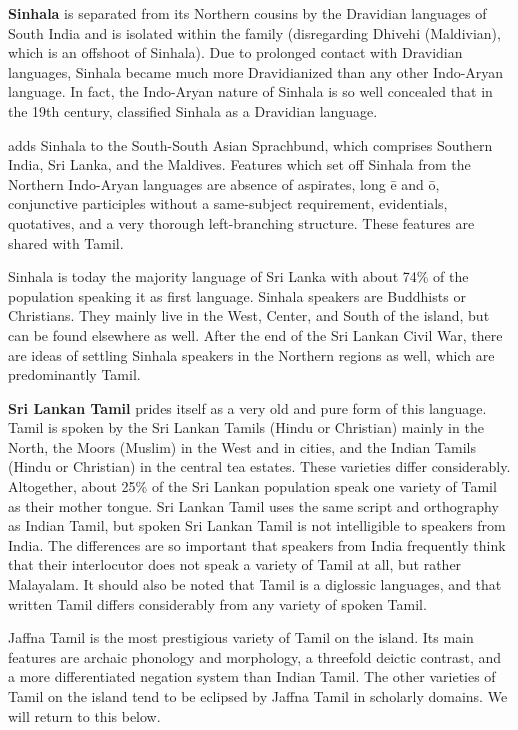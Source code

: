\documentclass[handout,utf8]{article}
\begin{document}
\textbf{Sinhala} is separated from its Northern cousins by the Dravidian languages of South India and is isolated within the family (disregarding Dhivehi (Maldivian), which is an offshoot of Sinhala). Due to prolonged contact with Dravidian languages, Sinhala became much more Dravidianized than any other Indo-Aryan language. In fact, the Indo-Aryan nature of Sinhala is so well concealed that in the 19th century, \citep{Rask1811} classified Sinhala as a Dravidian language. 

\citet{Gair} adds Sinhala to the South-South Asian Sprachbund, which comprises Southern India, Sri Lanka, and the Maldives. Features which set off Sinhala from the Northern Indo-Aryan languages are absence of aspirates, long \=e and \=o, conjunctive participles without a same-subject requirement, evidentials, quotatives, and a very thorough left-branching structure. These features are shared with Tamil.

Sinhala is today the majority language of Sri Lanka with about 74\% of the population speaking it as first language. Sinhala speakers are Buddhists or Christians. They mainly live in the West, Center, and South of the island, but can be found elsewhere as well. After the end of the Sri Lankan Civil War, there are ideas of settling Sinhala speakers in the Northern regions as well, which are predominantly Tamil.

\textbf{Sri Lankan Tamil} prides itself as a very old and pure form of this language. Tamil is spoken by the Sri Lankan Tamils (Hindu or Christian) mainly in the North, the Moors (Muslim) in the West and in cities, and the Indian Tamils (Hindu or Christian) in the central tea estates. These varieties differ considerably. Altogether, about 25\% of the Sri Lankan population speak one variety of Tamil as their mother tongue. 
Sri Lankan Tamil uses the same script and orthography as Indian Tamil, but spoken Sri Lankan Tamil is not intelligible to speakers from India. The differences are so important that speakers from India frequently think that their interlocutor does not speak a variety of Tamil at all, but rather Malayalam. It should also be noted that Tamil is a diglossic languages, and that written Tamil differs considerably from any variety of spoken Tamil. 

Jaffna Tamil is the most prestigious variety of Tamil on the island. Its main features are archaic phonology and morphology, a threefold deictic contrast, and a more differentiated negation system than Indian Tamil. The other varieties of Tamil on the island tend to be eclipsed by Jaffna Tamil in scholarly domains. We will return to this below. 
\end{document}
